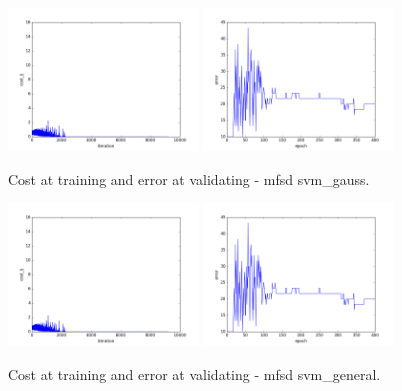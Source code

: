 \begin{figure}[htb]
\centering
\includegraphics[width=0.45\textwidth]{images/FRAv_casia_ImageNet/Imagenet2/mfsd/svm_gauss/cost.png}
\includegraphics[width=0.45\textwidth]{images/FRAv_casia_ImageNet/Imagenet2/mfsd/svm_gauss/error.png}
\caption{Cost at training and error at validating - mfsd svm\_gauss.} \label{fig:Imagenet2-mfsd-svm_gauss}
\end{figure}

\begin{figure}[htb]
\centering
\includegraphics[width=0.45\textwidth]{images/FRAv_casia_ImageNet/Imagenet2/mfsd/svm_general/cost.png}
\includegraphics[width=0.45\textwidth]{images/FRAv_casia_ImageNet/Imagenet2/mfsd/svm_general/error.png}
\caption{Cost at training and error at validating - mfsd svm\_general.} \label{fig:Imagenet2-mfsd-svm_general}
\end{figure}

